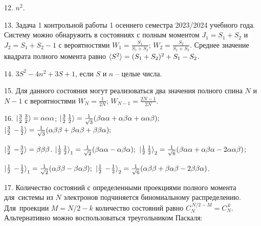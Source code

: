 12. $n^2.$\par
13. Задача 1 контрольной работы 1 осеннего семестра 2023/2024 учебного года. Систему можно обнаружить в состояниях с полным моментом $J_1=S_1+S_2$ и $J_2=S_1+S_2-1$ с вероятностями $W_1=\frac{S_1}{S_1+S_2}$; $W_2=\frac{S_2}{S_1+S_2}$. Среднее значение квадрата полного момента равно $\braket{S^2}=(S_1+S_2 )^2+S_1-S_2$.
\par
14. $3S^2-4n^2+3S+1$, если $S$ и $n$ – целые числа.\par
15. Для данного состояния могут реализоваться два значения полного спина $N$ и $N-1$ с вероятностями $W_{N}=\frac{1}{2N}$; $W_{N-1}=\frac{2N-1}{2N}$.\par
16. $\ket{\frac{3}{2}\,\frac{3}{2}}=\alpha\alpha\alpha$;\hspace{\fill}
$\ket{\frac{3}{2}\,\frac{1}{2}}=\frac{1}{\sqrt3}( \beta\alpha\alpha+\alpha\beta\alpha +\alpha\alpha\beta);$\hspace{\fill}$\ket{\frac{3}{2}\,-\!\frac{1}{2}}=\frac{1}{\sqrt3}( \alpha\beta\beta +\beta\alpha\beta +\beta\beta\alpha);$\par
\vspace{-\parskip+1mm}
$\ket{\frac{3}{2}\,-\!\frac{3}{2}}=\beta\beta\beta$. \hspace{\fill} $\ket{\frac{1}{2}\,\frac{1}{2}}_1 = \frac{1}{\sqrt2}( \beta\alpha\alpha-\alpha\beta\alpha);$ \hspace{\fill} $\ket{\frac{1}{2}\,\frac{1}{2}}_2 = \frac{1}{\sqrt6}( \beta\alpha\alpha+\alpha\beta\alpha -2\alpha\alpha\beta)$;\par
\vspace{-\parskip+1mm}
$\ket{\frac{1}{2}\,-\!\frac{1}{2}}_1 = \frac{1}{\sqrt2}( \alpha\beta\beta-\beta\alpha\beta);$ \quad $\ket{\frac{1}{2}\,-\!\frac{1}{2}}_2 = \frac{1}{\sqrt6}( \alpha\beta\beta+\beta\alpha\beta -2\beta\beta\alpha)$.
\par
17. Количество состояний с определенными проекциями полного момента для~системы из $N$ электронов подчиняется биномиальному распределению. Для~проекции $M =N/2-k$ количество состояний равно $C_{N}^{\,N/2-M}=C_{N}^{\,k}$. Альтернативно можно воспользоваться треугольником Паскаля:\par
\vspace{0.7mm}
\hspace{\fill}
